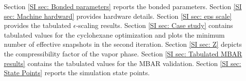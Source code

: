 \documentclass[journal=jced,manuscript=article]{achemso}
\begin{document}
Section \ref{SI sec: Bonded parameters} reports the bonded parameters. Section \ref{SI sec: Machine hardward} provides hardware details. Section \ref{SI sec: eps scale} provides the tabulated $\epsilon$-scaling results. Section \ref{SI sec: Case study} contains tabulated values for the cyclohexane optimization and plots the minimum number of effective snapshots in the second iteration. Section \ref{SI sec: Z} depicts the compressibility factor of the vapor phase. Section \ref{SI sec: Tabulated MBAR results} contains the tabulated values for the MBAR validation. Section \ref{SI sec: State Points} reports the simulation state points.



%
%
%
%
%
%
\end{document}
